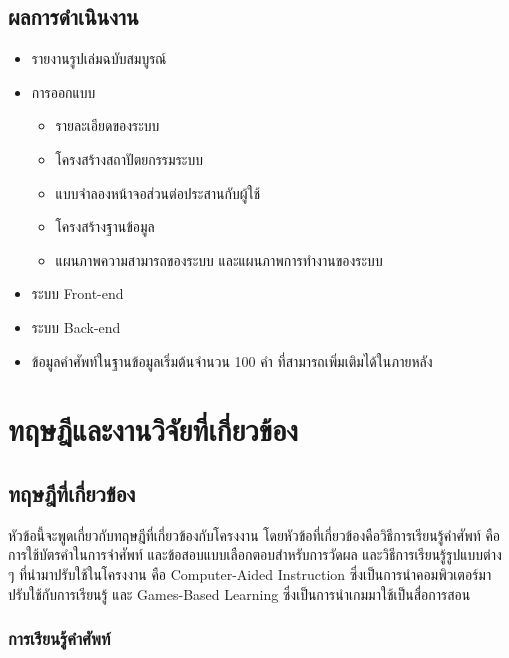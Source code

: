 \documentclass[12pt,oneside,openright,a4paper]{cpe-thai-project}
\begin{document}
\section{ผลการดำเนินงาน}

\begin{itemize}
	\item รายงานรูปเล่มฉบับสมบูรณ์
	\item การออกแบบ
	      \begin{itemize}
		      \item รายละเอียดของระบบ
		      \item โครงสร้างสถาปัตยกรรมระบบ
		      \item แบบจำลองหน้าจอส่วนต่อประสานกับผู้ใช้
		      \item โครงสร้างฐานข้อมูล
		      \item แผนภาพความสามารถของระบบ และแผนภาพการทำงานของระบบ
	      \end{itemize}
	\item ระบบ Front-end
	\item ระบบ Back-end
	\item ข้อมูลคำศัพท์ในฐานข้อมูลเริ่มต้นจำนวน 100 คำ ที่สามารถเพิ่มเติมได้ในภายหลัง
\end{itemize}


\chapter{ทฤษฎีและงานวิจัยที่เกี่ยวข้อง}


\section{ทฤษฎีที่เกี่ยวข้อง}

\hspace{1cm}
หัวข้อนี้จะพูดเกี่ยวกับทฤษฎีที่เกี่ยวข้องกับโครงงาน โดยหัวข้อที่เกี่ยวข้องคือวิธีการเรียนรู้คำศัพท์
คือการใช้บัตรคำในการจำศัพท์ และข้อสอบแบบเลือกตอบสำหรับการวัดผล และวิธีการเรียนรู้รูปแบบต่าง ๆ
ที่นำมาปรับใช้ในโครงงาน คือ Computer-Aided Instruction ซึ่งเป็นการนำคอมพิวเตอร์มาปรับใช้กับการเรียนรู้
และ Games-Based Learning ซึ่งเป็นการนำเกมมาใช้เป็นสื่อการสอน

\subsection{การเรียนรู้คำศัพท์}
\end{document}
